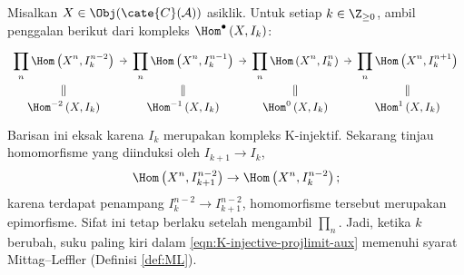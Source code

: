 \begin{bukti}
	Misalkan $X\in\Obj(\cate{C}(\mathcal{A}))$ asiklik. Untuk setiap
	$k\in\Z_{\geq0}$, ambil penggalan berikut dari kompleks
	$\Hom^\bullet\left(X,I_k\right)$:
	\begin{equation}\label{eqn:K-injective-projlimit-aux}\begin{tikzcd}
		[row sep=small, column sep=tiny,
		every cell/.append style = {font = \small}]
		\displaystyle\prod_n \Hom\left( X^n, I_k^{n-2} \right) \arrow[r] &
		\displaystyle\prod_n \Hom\left( X^n, I_k^{n-1} \right) \arrow[r] &
		\displaystyle\prod_n \Hom\left( X^n, I_k^n \right) \arrow[r] &
		\displaystyle\prod_n \Hom\left( X^n, I_k^{n+1} \right) \\
		\Hom^{-2}\left( X, I_k \right) \arrow[equal, u] &
		\Hom^{-1}\left( X, I_k \right) \arrow[equal, u] &
		\Hom^0\left( X, I_k \right) \arrow[equal, u] &
		\Hom^1\left( X, I_k \right) \arrow[equal, u]
	\end{tikzcd}\end{equation}
	Barisan ini eksak karena $I_k$ merupakan kompleks K-injektif. Sekarang
	tinjau homomorfisme yang diinduksi oleh $I_{k+1}\to I_k$,
	\[
	\Hom\left(X^n,I_{k+1}^{n-2}\right)\to
	\Hom\left(X^n,I_k^{n-2}\right);
	\]
	karena terdapat penampang $I_k^{n-2}\to I_{k+1}^{n-2}$, homomorfisme
	tersebut merupakan epimorfisme. Sifat ini tetap berlaku setelah mengambil
	$\prod_n$. Jadi, ketika $k$ berubah, suku paling kiri dalam
	\eqref{eqn:K-injective-projlimit-aux} memenuhi syarat Mittag--Leffler
	(Definisi \ref{def:ML}).


\end{bukti}
